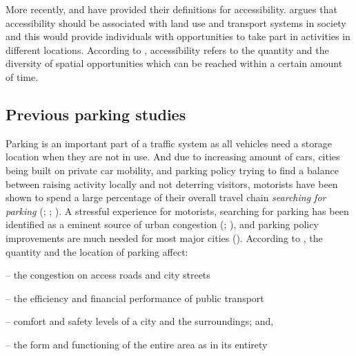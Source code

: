 More recently,  and  have provided their definitions for accessibility. \citeauthor{Geurs2004} argues that accessibility should be associated with land use and transport systems in society and this would provide individuals with opportunities to take part in activities in different locations. According to \cite{Bertolini2003}, accessibility refers to the quantity and the diversity of spatial opportunities which can be reached within a certain amount of time.

\newpage
\subsection{Previous parking studies}
\justify

Parking is an important part of a traffic system as all vehicles need a storage location when they are not in use. And due to increasing amount of cars, cities being built on private car mobility, and parking policy trying to find a balance between raising activity locally and not deterring visitors, motorists have been shown to spend a large percentage of their overall travel chain \textit{searching for parking} (\cite{Axhausen1991}; \cite{Marsden2006}; \cite{Shoup2006}). A stressful experience for motorists, searching for parking has been identified as a eminent source of urban congestion (\cite{Axhausen1993}; \cite{Gantelet2006}), and parking policy improvements are much needed for most major cities (\cite{Benenson2008a}). According to , the quantity and the location of parking affect:

\begin{itemize}
    \begin{singlespace}
        \item[--] the congestion on access roads and city streets
        \item[--] the efficiency and financial performance of public transport
        \item[--] comfort and safety levels of a city and the surroundings; and,
        \item[--] the form and functioning of the entire area as in its entirety
    \end{singlespace}
\end{itemize}

